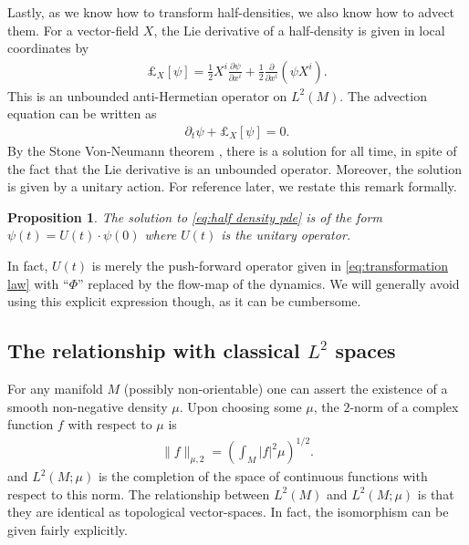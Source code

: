 \documentclass[12pt]{amsart}
\newcommand{\pder}[2]{\ensuremath{\frac{ \partial #1}{\partial #2}}}
\newtheorem{prop}[thm]{Proposition}
\begin{document}
Lastly, as we know how to transform half-densities, we also know how to advect them.
For a vector-field $X$, the Lie derivative of a half-density is given in local coordinates by
\begin{align}
	\pounds_{X}[\psi] = \frac{1}{2} X^{i} \pder{\psi}{x^{i}} + \frac{1}{2} \pder{}{x^{i}} \left( \psi X^{i} \right). \label{eq:half density pde}
\end{align}
This is an unbounded anti-Hermetian operator on $L^{2}(M)$.
The advection equation can be written as
\begin{align}
	\partial_{t} \psi + \pounds_{X}[\psi] = 0.
\end{align}
By the Stone Von-Neumann theorem \cite{Conway1990}, there is a solution for all time, in spite of the fact that the Lie derivative is an unbounded operator.
Moreover, the solution is given by a unitary action.  For reference later, we restate this remark formally.
\begin{prop} \label{prop:stone}
	The solution to \eqref{eq:half density pde} is of the form $\psi(t) = U(t) \cdot \psi(0)$ where $U(t)$ is
	the unitary operator.
\end{prop}

In fact, $U(t)$ is merely the push-forward operator given in \eqref{eq:transformation law} with ``$\Phi$'' replaced by the flow-map of the dynamics.
We will generally avoid using this explicit expression though, as it can be cumbersome.


\subsection{The relationship with classical $L^{2}$ spaces}
\label{sec:classical_Lebesgue}
For any manifold $M$ (possibly non-orientable) one can assert the existence of a smooth non-negative density $\mu$.
Upon choosing some $\mu$, the $2$-norm of a complex function $f$ with respect to $\mu$ is
\begin{align}
	\| f \|_{\mu,2} =  \left( \int_M |f|^2 \mu \right)^{1/2}.
\end{align}
and $L^2(M ; \mu)$ is the completion of the space of continuous functions with respect to this norm.
The relationship between $L^{2}(M)$ and $L^{2}(M;\mu)$ is that they are identical as topological vector-spaces.
In fact, the isomorphism can be given fairly explicitly.
\end{document}
